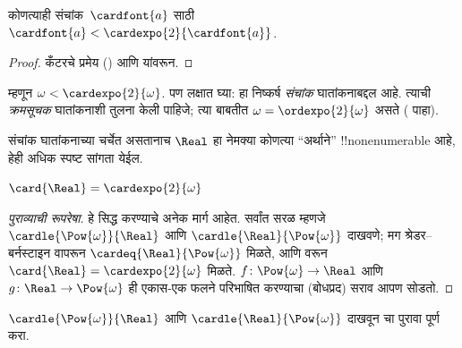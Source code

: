 \documentclass[../../../include/open-logic-section]{subfiles}
\begin{document}
\begin{cor}
कोणत्याही संचांक~$\cardfont{a}$ साठी $\cardfont{a} < \cardexpo{2}{\cardfont{a}}$.
\end{cor}

\begin{proof}
कँटरचे प्रमेय () आणि
 यांवरून.
\end{proof}
\noindent
म्हणून $\omega < \cardexpo{2}{\omega}$. पण लक्षात घ्या: हा निष्कर्ष \emph{संचांक} घातांकनाबद्दल आहे. त्याची \emph{क्रमसूचक} घातांकनाशी तुलना केली पाहिजे; त्या बाबतीत $\omega =
\ordexpo{2}{\omega}$ असते ( पाहा).

संचांक घातांकनाच्या चर्चेत असतानाच $\Real$ हा नेमक्या कोणत्या “अर्थाने” !!{nonenumerable} आहे, हेही अधिक स्पष्ट सांगता येईल.

\begin{thm}
$\card{\Real} = \cardexpo{2}{\omega}$
\end{thm}

\begin{proof}[पुराव्याची रूपरेषा]
हे सिद्ध करण्याचे अनेक मार्ग आहेत. सर्वांत सरळ म्हणजे $\cardle{\Pow{\omega}}{\Real}$ आणि
$\cardle{\Real}{\Pow{\omega}}$ दाखवणे; मग श्रेडर--बर्नस्टाइन वापरून
$\cardeq{\Real}{\Pow{\omega}}$ मिळते, आणि
 वरून
$\card{\Real} = \cardexpo{2}{\omega}$ मिळते. $f \colon
\Pow{\omega} \to \Real$ आणि $g \colon \Real \to \Pow{\omega}$ ही एकास-एक फलने परिभाषित करण्याचा (बोधप्रद) सराव आपण सोडतो.
\end{proof}

\begin{prob}
$\cardle{\Pow{\omega}}{\Real}$ आणि
$\cardle{\Real}{\Pow{\omega}}$ दाखवून  चा पुरावा पूर्ण करा.
\end{prob}
\end{document}
